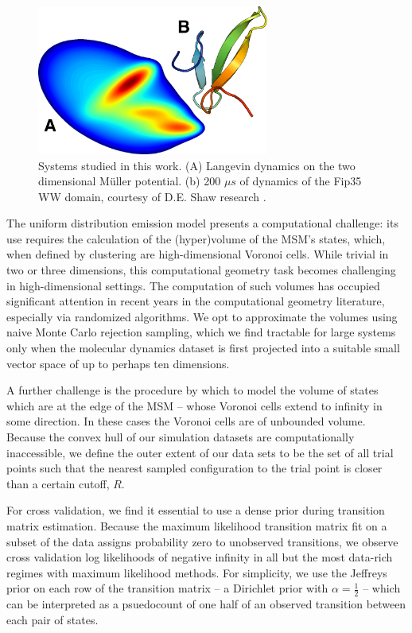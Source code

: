 \documentclass[twocolumn,floatfix,nofootinbib,aps]{revtex4-1}
\begin{document}
\begin{figure}
\centering
\includegraphics[width=3in]{figs/mull_ww.png}
\caption{Systems studied in this work. (A) Langevin dynamics on the two dimensional M\"{u}ller potential. (b) 200 $\mu s$ of dynamics of the Fip35 WW domain\cite{Liu2008Experimental}, courtesy of D.E. Shaw research \cite{Shaw2010Atomic}.}
\end{figure}

The uniform distribution emission model presents a computational challenge: its use requires the calculation of the (hyper)volume of the MSM's states, which, when defined by clustering are high-dimensional Voronoi cells. While trivial in two or three dimensions, this computational geometry task becomes challenging in high-dimensional settings. The computation of such volumes has occupied significant attention in recent years in the computational geometry literature, especially via randomized algorithms\cite{Kannan97, Simonovits03, Lovasz03}. We opt to approximate the volumes using naive Monte Carlo rejection sampling, which we find tractable for large systems only when the molecular dynamics dataset is first projected into a suitable small vector space of up to perhaps ten dimensions.

A further challenge is the procedure by which to model the volume of states which are at the edge of the MSM -- whose Voronoi cells extend to infinity in some direction. In these cases the Voronoi cells are of unbounded volume. Because the convex hull of our simulation datasets are computationally inaccessible, we define the outer extent of our data sets to be the set of all trial points such that the nearest sampled configuration to the trial point is closer than a certain cutoff, $R$.

For cross validation, we find it essential to use a dense prior during transition matrix estimation. Because the maximum likelihood transition matrix fit on a subset of the data assigns probability zero to unobserved transitions, we observe cross validation log likelihoods of negative infinity in all but the most data-rich regimes with maximum likelihood methods. For simplicity, we use the Jeffreys prior on each row of the transition matrix -- a Dirichlet prior with $\alpha=\frac{1}{2}$ -- which can be interpreted as a psuedocount of one half of an observed transition between each pair of states.
\end{document}
